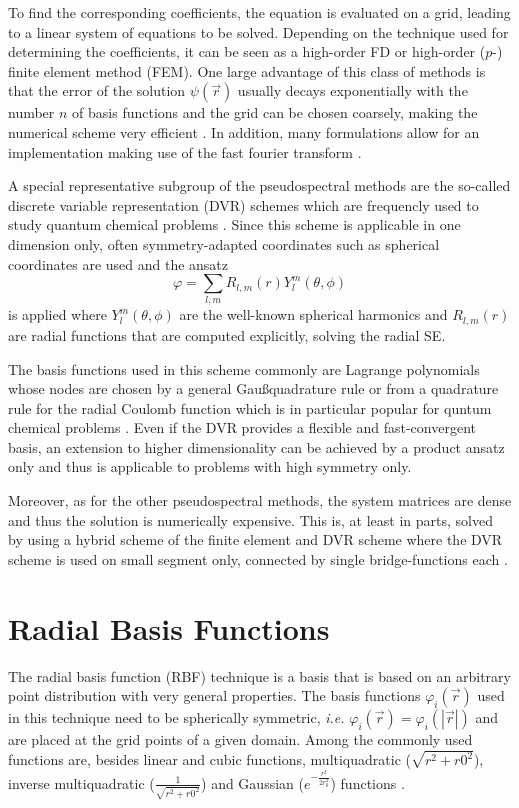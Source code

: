 To find the corresponding coefficients, the equation is evaluated on a grid, leading to a linear system of equations to be solved.
Depending on the technique used for determining the coefficients, it can be seen as a high-order FD or high-order ($p$-) finite element method (FEM).
One large advantage of this class of methods is that the error of the solution $\psi(\vec{r})$ usually decays exponentially with the number $n$ of basis functions and the grid can be chosen coarsely, making the numerical scheme very efficient \cite{PSbook, Tannor}.
In addition, many formulations allow for an implementation making use of the fast fourier transform \cite{PSbook}.

A special representative subgroup of the pseudospectral methods are the so-called discrete variable representation (DVR) schemes which are frequencly used to study quantum chemical problems \cite{yipDVR,impLDVR,coulDVR}.
Since this scheme is applicable in one dimension only, often symmetry-adapted coordinates such as spherical coordinates are used and the ansatz
\begin{equation}
  \varphi= \sum_{l, m} R_{l,m}(r) Y_l^m(\theta, \phi)
\end{equation}
is applied where $Y_l^m(\theta, \phi)$ are the well-known spherical harmonics \cite{SphHarm} and $R_{l,m}(r)$ are radial functions that are computed explicitly, solving the radial SE.

The basis functions used in this scheme commonly are Lagrange polynomials \cite{taoDVR,impLDVR,coulDVR} whose nodes are chosen by a general Gau\ss quadrature rule \cite{impLDVR} or from a quadrature rule for the radial Coulomb function which is in particular popular for quntum chemical problems \cite{coulDVR,Tannor}.
Even if the DVR provides a flexible and fast-convergent basis, an extension to higher dimensionality can be achieved by a product ansatz only and thus is applicable to problems with high symmetry only.

Moreover, as for the other pseudospectral methods, the system matrices are dense and thus the solution is numerically expensive.
This is, at least in parts, solved by using a hybrid scheme of the finite element and DVR scheme where the DVR scheme is used on small segment only, connected by single bridge-functions each \cite{taoDVR,impLDVR}.

\section{Radial Basis Functions}
The radial basis function (RBF) technique is a basis that is based on an arbitrary point distribution with very general properties.
The basis functions $\varphi_i(\vec{r})$ used in this technique need to be spherically symmetric, \textit{i.e.} $\varphi_i(\vec{r})=\varphi_i(|\vec{r}|)$ and are placed at the grid points of a given domain.
Among the commonly used functions are, besides linear and cubic functions, multiquadratic ($\sqrt { r^2 + r0^2 }$), inverse multiquadratic ($\frac{1}{ \sqrt { r^2 + r0^2}}$) and Gaussian ($ e^{-\frac{r^2}{2r_0^2}}$) functions \cite{rbfSE,rbfWave}.

